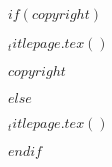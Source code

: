 $if(copyright)$
  \begin{frontmatter}
  \begin{titlepage}
  $_titlepage.tex()$
  \end{titlepage}
  $copyright$
  \end{frontmatter}

$else$
  \begin{titlepage}
  $_titlepage.tex()$
  \end{titlepage}
$endif$

\tableofcontents
{\let\newpage\relax}

\RaggedRight